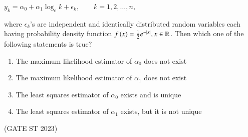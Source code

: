 \begin{enumerate}[label=\thechapter.\arabic*,ref=\thechapter.\theenumi]
\begin{center}
	$y_{k} = \alpha_{0} + \alpha_{1} \log_{e}k + \epsilon_{k}, \qquad k = 1,2,…,n,$\\
\end{center}
where $\epsilon_{k}$'s are independent and identically distributed random variables each
having probability density function $ f\left(x\right) = \frac{1}{2} e^{-|x|}, x \in \mathbb{R}$. Then which one of
the following statements is true? 
\begin{enumerate}[label=(\Alph*)]
	\item The maximum likelihood estimator of $\alpha_{0}$ does not exist
	\item The maximum likelihood estimator of $\alpha_{1}$ does not exist
	\item The least squares estimator of $\alpha_{0}$ exists and is unique
	\item The least squares estimator of $\alpha_{1}$ exists, but it is not unique
\end{enumerate}
\hfill(GATE ST 2023)\\

\end{enumerate}
